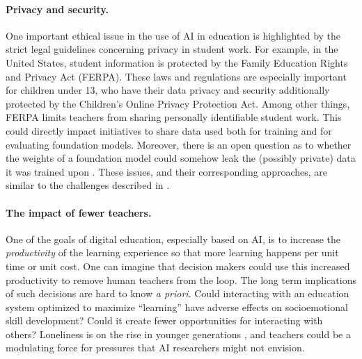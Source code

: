 \paragraph{Privacy and security.} One important ethical issue in the use of AI in education is highlighted by the strict legal guidelines concerning privacy in student work. For example, in the United States, student information is protected by the Family Education Rights and Privacy Act (FERPA). These laws and regulations are especially important for children under 13, who have their data privacy and security additionally protected by the Children's Online Privacy Protection Act. Among other things, FERPA limits teachers from sharing personally identifiable student work. This could directly impact initiatives to share data used both for training and for evaluating foundation models. Moreover, there is an open question as to whether the weights of a foundation model could somehow leak the (possibly private) data it was trained upon \cite{nasrPrivacy2018, songRemember2017}. These issues, and their corresponding approaches, are similar to the challenges described in  . 

\paragraph{The impact of fewer teachers.} One of the goals of digital education, especially based on AI, is to increase the \emph{productivity} of the learning experience so that more learning happens per unit time or unit cost. One can imagine that decision makers could use this increased productivity to remove human teachers from the loop. The long term implications of such decisions are hard to know \emph{a priori}. Could interacting with an education system optimized to maximize ``learning'' have adverse effects on socioemotional skill development? Could it create fewer opportunities for interacting with others? Loneliness is on the rise in younger generations \citep{cigna_2018}, and teachers could be a modulating force for pressures that AI researchers might not envision.


